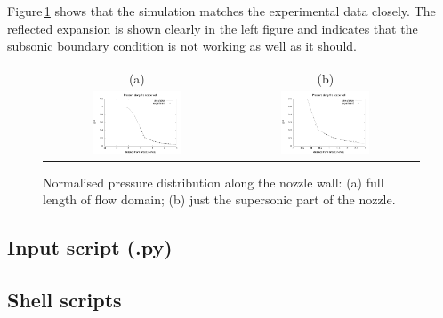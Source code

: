 Figure\,\ref{back-profile-fig} shows that the simulation matches the
experimental data closely.
The reflected expansion is shown clearly in the left figure and indicates 
that the subsonic boundary condition is not working as well as it should.


\begin{figure}[htbp]
\begin{center}
\begin{tabular}{cc}
(a) & (b) \\
\includegraphics[width=0.5\textwidth]{../2D/back-nozzle/back_profile_whole.pdf} &
\includegraphics[width=0.5\textwidth]{../2D/back-nozzle/back_profile_supersonic.pdf}
\end{tabular}
\end{center}
\caption{Normalised pressure distribution along the nozzle wall:
         (a) full length of flow domain; 
	 (b) just the supersonic part of the nozzle.}
\label{back-profile-fig}
\end{figure}

\newpage
\subsection{Input script (.py)}
\topbar

\bottombar


\subsection{Shell scripts}
\label{back-sh-files}
\topbar

\bottombar

